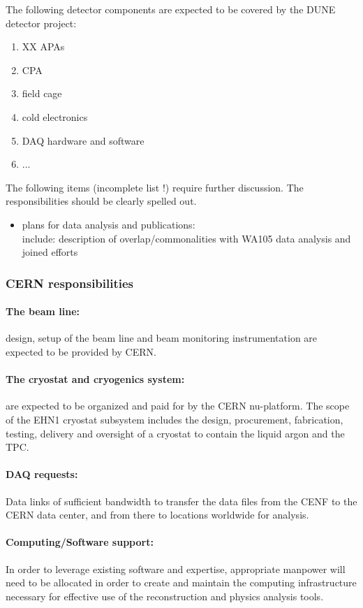 The following detector components are expected to be covered by the DUNE detector project:
\begin{enumerate}
\item XX APAs
\item CPA
\item field cage
\item cold electronics
\item DAQ hardware and software
\item ...
\end{enumerate}

The following items (incomplete list !) require further discussion. The responsibilities should be clearly spelled out.

\begin{itemize}

\item plans for data analysis and publications:\\
include: description of overlap/commonalities with WA105 data analysis and joined efforts

\end{itemize}




\subsubsection{CERN responsibilities}

\paragraph{The beam line:} design, setup of the beam line and beam monitoring instrumentation are expected to be provided by CERN.

\paragraph{The cryostat and cryogenics system:} are expected to be organized and paid for by the CERN nu-platform.
The scope of the EHN1 cryostat subsystem includes the design, procurement, fabrication, testing, delivery and oversight of a cryostat to contain the liquid argon and the TPC.\\

\paragraph{DAQ requests:}  Data links of sufficient bandwidth to transfer the data files from the CENF to the CERN data center, and from there to locations worldwide for analysis. \\

\paragraph{Computing/Software support:} In order to leverage existing software and expertise, appropriate manpower will need to be allocated in order to create and maintain the computing infrastructure necessary for effective use of the reconstruction and physics analysis tools.\\



